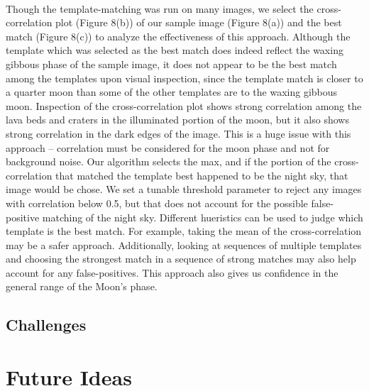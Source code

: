 \documentclass[]{article}
\begin{document}
\\
Though the template-matching was run on many images, we select the cross-correlation plot (Figure 8(b)) of our sample image (Figure 8(a)) and the best match (Figure 8(c)) to analyze the effectiveness of this approach. Although the template which was selected as the best match does indeed reflect the waxing gibbous phase of the sample image, it does not appear to be the best match among the templates upon visual inspection, since the template match is closer to a quarter moon than some of the other templates are to the waxing gibbous moon. Inspection of the cross-correlation plot shows strong correlation among the lava beds and craters in the illuminated portion of the moon, but it also shows strong correlation in the dark edges of the image. This is a huge issue with this approach -- correlation must be considered for the moon phase and not for background noise. Our algorithm selects the max, and if the portion of the cross-correlation that matched the template best happened to be the night sky, that image would be chose. We set a tunable threshold parameter to reject any images with correlation below 0.5, but that does not account for the possible false-positive matching of the night sky. Different hueristics can be used to judge which template is the best match. For example, taking the mean of the cross-correlation may be a safer approach. Additionally, looking at sequences of multiple templates and choosing the strongest match in a sequence of strong matches may also help account for any false-positives. This approach also gives us confidence in the general range of the Moon's phase.
\subsection*{Challenges}
\section*{Future Ideas}
\end{document}
